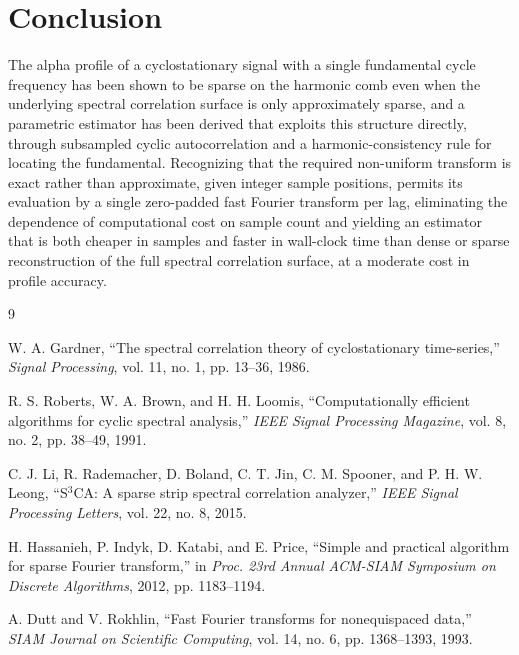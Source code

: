 \documentclass[10pt,twocolumn]{article}
\begin{document}
\section{Conclusion}

The alpha profile of a cyclostationary signal with a single fundamental
cycle frequency has been shown to be sparse on the harmonic comb even when
the underlying spectral correlation surface is only approximately sparse,
and a parametric estimator has been derived that exploits this structure
directly, through subsampled cyclic autocorrelation and a
harmonic-consistency rule for locating the fundamental. Recognizing that
the required non-uniform transform is exact rather than approximate, given
integer sample positions, permits its evaluation by a single zero-padded
fast Fourier transform per lag, eliminating the dependence of computational
cost on sample count and yielding an estimator that is both cheaper in
samples and faster in wall-clock time than dense or sparse reconstruction
of the full spectral correlation surface, at a moderate cost in profile
accuracy.

{\small
\begin{thebibliography}{9}

W. A. Gardner, ``The spectral correlation theory of cyclostationary
time-series,'' \emph{Signal Processing}, vol. 11, no. 1, pp. 13--36, 1986.

R. S. Roberts, W. A. Brown, and H. H. Loomis, ``Computationally efficient
algorithms for cyclic spectral analysis,'' \emph{IEEE Signal Processing
Magazine}, vol. 8, no. 2, pp. 38--49, 1991.

C. J. Li, R. Rademacher, D. Boland, C. T. Jin, C. M. Spooner, and P. H. W.
Leong, ``S$^3$CA: A sparse strip spectral correlation analyzer,'' \emph{IEEE
Signal Processing Letters}, vol. 22, no. 8, 2015.

H. Hassanieh, P. Indyk, D. Katabi, and E. Price, ``Simple and practical
algorithm for sparse Fourier transform,'' in \emph{Proc. 23rd Annual
ACM-SIAM Symposium on Discrete Algorithms}, 2012, pp. 1183--1194.

A. Dutt and V. Rokhlin, ``Fast Fourier transforms for nonequispaced
data,'' \emph{SIAM Journal on Scientific Computing}, vol. 14, no. 6, pp.
1368--1393, 1993.

\end{thebibliography}
}
\end{document}
